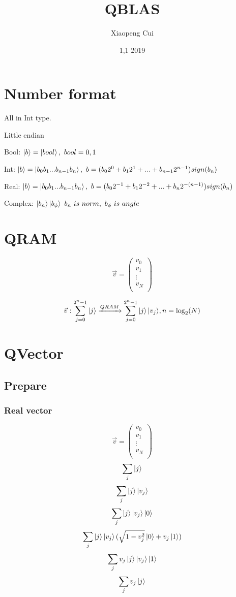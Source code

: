 \documentclass{article}
\begin{document}
\title{QBLAS}
\author{Xiaopeng Cui}
\date{1,1 2019}
\maketitle
\tableofcontents
\section{Number format}
All in Int type.

Little endian

Bool: $ \ket{b} = \ket{bool},\ bool=0,1 $

Int: $ \ket{b} = \ket{b_0b_1...b_{n-1}b_n},	\  b= (b_0 2^0 + b_1 2^1+ ... + b_{n-1} 2^{n-1}) sign(b_n)  $

Real: $ \ket{b} = \ket{b_0b_1...b_{n-1}b_n},\ 	 b= (b_0 2^{-1} + b_1 2^{-2}+ ... + b_n 2^{-(n-1)} ) sign(b_n)  $

Complex: $ \ket{b_n}\ket{b_\phi} \ 	b_n\  is\  norm,\  b_\phi \  is\  angle $


\section{QRAM}
$$ \vec{v} =\left(
\begin{array}{c}
v_0 \\
v_1 \\
\vdots \\
v_N \\
\end{array}
\right) $$

$$ \vec{v}:		\sum_{ j=0 }^{ 2^n-1 } { \ket{j}}	\xrightarrow{QRAM}		\sum_{ j=0 }^{2^n-1} { \ket{j} \ket{v_j} },	n=\log_2(N)	$$	

\section{QVector}
\subsection{Prepare}
\subsubsection{ Real vector}
$$ \vec{v} =\left(
\begin{array}{c}
v_0 \\
v_1 \\
\vdots \\
v_N \\
\end{array}
\right) $$
$$ \sum_j{ \ket{j} } $$
$$  \sum_j{\ket{j}\ket{v_j}} $$
$$  \sum_j{\ket{j}\ket{v_j} \ket{0} } $$
$$  \sum_j{\ket{j}\ket{v_j} ( \sqrt{1-v_j^2} \ket{0} + v_j\ket{1}) } $$
$$  \sum_j{v_j\ket{j}\ket{v_j}\ket{1} } $$
$$  \sum_j{v_j\ket{j} } $$
\end{document}
